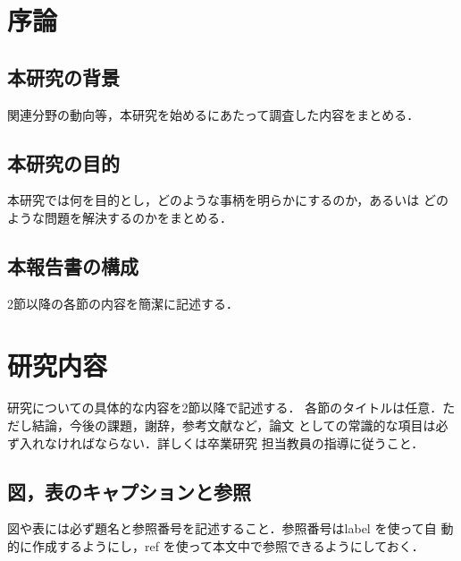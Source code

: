 \documentclass{jsarticle}
\begin{document}
\newpage

\tableofcontents
\newpage
\setcounter{page}{1}
\pagestyle{plain}

\section{序論}\label{sec1}
\subsection{本研究の背景}
関連分野の動向等，本研究を始めるにあたって調査した内容をまとめる．

\subsection{本研究の目的}
本研究では何を目的とし，どのような事柄を明らかにするのか，あるいは
どのような問題を解決するのかをまとめる．

\subsection{本報告書の構成}
2節以降の各節の内容を簡潔に記述する．

\section{研究内容}\label{sec2}
研究についての具体的な内容を2節以降で記述する．
各節のタイトルは任意．ただし結論，今後の課題，謝辞，参考文献など，論文
としての常識的な項目は必ず入れなければならない．詳しくは卒業研究
担当教員の指導に従うこと．


\subsection{図，表のキャプションと参照}

図や表には必ず題名と参照番号を記述すること．参照番号はlabel を使って自
動的に作成するようにし，ref を使って本文中で参照できるようにしておく．
\end{document}
